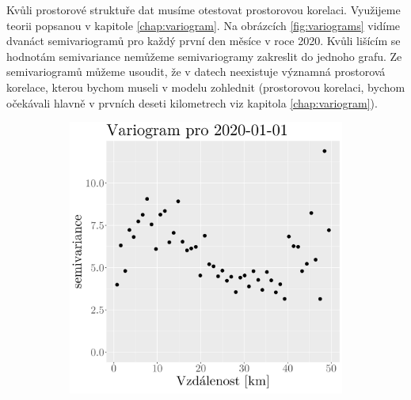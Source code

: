 Kvůli prostorové struktuře dat musíme otestovat prostorovou korelaci. Využijeme teorii popsanou v kapitole \ref{chap:variogram}. Na obrázcích \ref{fig:variograms} vidíme dvanáct semivariogramů pro každý první den měsíce v roce 2020. Kvůli lišícím se hodnotám semivariance nemůžeme semivariogramy zakreslit do jednoho grafu. Ze semivariogramů můžeme usoudit, že v datech neexistuje významná prostorová korelace, kterou bychom museli v modelu zohlednit (prostorovou korelaci, bychom očekávali hlavně v prvních deseti kilometrech viz kapitola \ref{chap:variogram}).

\begin{figure}
	\centering
	\begin{subfigure}{0.30\textwidth}
		\includegraphics[width=\textwidth]{img/ch2/variograms/variogram_max15cm1.png}
		\caption{}
		\label{fig:variogram1}
	\end{subfigure}
	\hfill
	\begin{subfigure}{0.30\textwidth}

\end{subfigure}
\end{figure}
